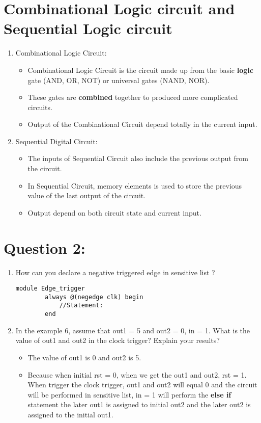 \documentclass[12pt]{article}
\begin{document}
\section{Combinational Logic circuit and Sequential Logic circuit}
\begin{enumerate}
    \item Combinational Logic Circuit: \\
    \begin{itemize}
        \item Combinational Logic Circuit is the circuit made up from the basic \textbf{logic} gate (AND, OR, NOT) or universal gates (NAND, NOR).  
        \item These gates are \textbf{combined} together to produced more complicated circuits.
        \item Output of the Combinational Circuit depend totally in the current input.
    \end{itemize}
    \item Sequential Digital Circuit: \\
    \begin{itemize}
        \item The inputs of Sequential Circuit also include the previous output from the circuit. 
        \item In Sequential Circuit, memory elements is used to store the previous value of the last output of the circuit. 
        \item Output depend on both circuit state and current input.
    \end{itemize}
\end{enumerate}
\section{Question 2: }
\begin{enumerate}
    \item How can you declare a negative triggered edge in sensitive list ? \\
    \begin{lstlisting}[style={verilog-style}]
        module Edge_trigger
        always @(negedge clk) begin
            //Statement:
        end
    \end{lstlisting}
    \item In the example 6, assume that out1 = 5 and out2 = 0, in = 1. What is the value of out1 and out2 in the clock trigger? Explain your results? \\
     \begin{itemize}
        \item The value of out1 is 0 and out2 is 5.
        \item Because when initial rst = 0, when we get the out1 and out2, rst = 1. When trigger the clock trigger, out1 and out2 will equal 0 and the circuit will be performed in sensitive list, in = 1 will perform the \textbf{else if} statement the later out1 is assigned to initial out2 and the later out2 is assigned to the initial out1.
     \end{itemize} 
\end{enumerate}
\end{document}
